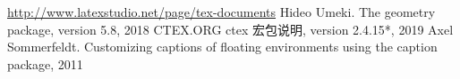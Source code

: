 \begin{thebibliography}{99}%
\addtolength{\itemsep}{-1 em} %
 \url{http://www.latexstudio.net/page/tex-documents}
 Hideo Umeki. The geometry package, version 5.8, 2018
 CTEX.ORG ctex 宏包说明, version 2.4.15*, 2019
 Axel Sommerfeldt. Customizing captions of floating environments using the caption package, 2011
\end{thebibliography}